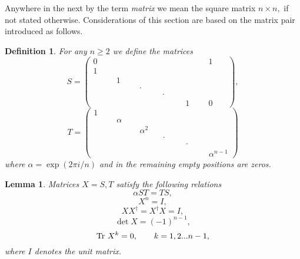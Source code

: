 \documentclass[a4paper,a4paper]{article}
\newtheorem{definition}[theorem]{Definition}
\newtheorem{lemma}[theorem]{Lemma}
\begin{document}
Anywhere in the next by the term \textit{matrix} we mean the square matrix $%
n\times n,$ if not stated otherwise. Considerations of this section are
based on the matrix pair introduced as follows.

\begin{definition}
\label{def1}For any $n\geq 2$ we define the matrices%
\begin{equation}
S=\left( 
\begin{array}{cccccc}
0 & \qquad & \qquad & \qquad & \qquad & 1 \\ 
1 &  &  &  &  & \qquad \\ 
\qquad & 1 &  &  &  &  \\ 
&  & \cdot &  &  &  \\ 
&  &  & \cdot &  &  \\ 
&  &  &  & 1 & 0%
\end{array}%
\right) ,  \label{ga1}
\end{equation}%
\begin{equation}
T=\left( 
\begin{array}{cccccc}
1 & \qquad & \qquad & \qquad & \qquad &  \\ 
\qquad & \alpha &  &  &  &  \\ 
&  & \alpha ^{2} &  &  &  \\ 
&  &  & \cdot &  &  \\ 
&  &  &  & \cdot &  \\ 
&  &  &  &  & \alpha ^{n-1}%
\end{array}%
\right)  \label{gb1}
\end{equation}%
where $\alpha =\exp (2\pi i/n)$ and in the remaining empty positions are
zeros.
\end{definition}

\begin{lemma}
Matrices $X=S,T$ satisfy the following relations 
\begin{equation}  \label{ga2}
\alpha ST=TS,
\end{equation}
\begin{equation}  \label{ga3}
X^n=I,
\end{equation}
\begin{equation}  \label{ga4}
XX^{\dagger }=X^{\dagger }X=I,
\end{equation}
\begin{equation}  \label{ga5}
\det X=(-1)^{n-1},
\end{equation}
\begin{equation}  \label{ga6}
\text{\textrm{Tr} }X^k=0,\qquad k=1,2...n-1,
\end{equation}
where $I$ denotes the unit matrix.
\end{lemma}
\end{document}
